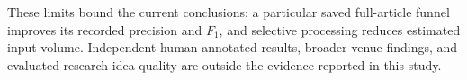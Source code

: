 These limits bound the current conclusions: a particular saved full-article funnel improves
its recorded precision and $F_1$, and selective processing reduces estimated input volume.
Independent human-annotated results, broader venue findings, and evaluated research-idea quality
are outside the evidence reported in this study.
